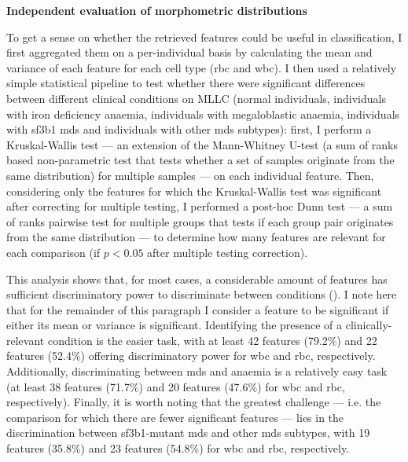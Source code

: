 \noindent \textbf{Independent evaluation of morphometric distributions}

To get a sense on whether the retrieved features could be useful in classification, I first aggregated them on a per-individual basis by calculating the mean and variance of each feature for each cell type (\ac{rbc} and \ac{wbc}). I then used a relatively simple statistical pipeline to test whether there were significant differences between different clinical conditions on MLLC (normal individuals, individuals with iron deficiency anaemia, individuals with megaloblastic anaemia, individuals with \ac{sf3b1} \ac{mds} and individuals with other \ac{mds} subtypes): first, I perform a Kruskal-Wallis test --- an extension of the Mann-Whitney U-test (a sum of ranks based non-parametric test that tests whether a set of samples originate from the same distribution) for multiple samples --- on each individual feature. Then, considering only the features for which the Kruskal-Wallis test was significant after correcting for multiple testing, I performed a post-hoc Dunn test --- a sum of ranks pairwise test for multiple groups that tests if each group pair originates from the same distribution --- to determine how many features are relevant for each comparison (if $p<0.05$ after multiple testing correction).

This analysis shows that, for most cases, a considerable amount of features has sufficient discriminatory power to discriminate between conditions (). I note here that for the remainder of this paragraph I consider a feature to be significant if either its mean or variance is significant. Identifying the presence of a clinically-relevant condition is the easier task, with at least 42 features (79.2\%) and 22 features (52.4\%) offering discriminatory power for \ac{wbc} and \ac{rbc}, respectively. Additionally, discriminating between \ac{mds} and anaemia is a relatively easy task (at least 38 features (71.7\%) and 20 features (47.6\%) for \ac{wbc} and \ac{rbc}, respectively). Finally, it is worth noting that the greatest challenge --- i.e. the comparison for which there are fewer significant features --- lies in the discrimination between \ac{sf3b1}-mutant \ac{mds} and other \ac{mds} subtypes, with 19 features (35.8\%) and 23 features (54.8\%) for \ac{wbc} and \ac{rbc}, respectively. 

\begin{figure}[!ht]
\end{figure}

